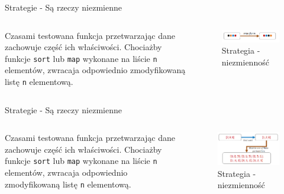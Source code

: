 \begin{frame}{Strategie - Są rzeczy niezmienne}
    \begin{columns}[t]
            Czasami testowana funkcja przetwarzając dane zachowuje część ich właściwości.
            Chociażby funkcje \texttt{sort} lub \texttt{map} wykonane na liście \texttt{n} elementów, zwracaja odpowiednio zmodyfikowaną listę \texttt{n} elementową.
        \centering
        \begin{figure}
            \centering
            \includegraphics[width=1\textwidth]{images/property_invariant.png}
            \caption{Strategia - niezmienność}
            \label{fig:invariant_strategy}
        \end{figure}    
    \end{columns}
\end{frame}

\begin{frame}{Strategie - Są rzeczy niezmienne}
    \begin{columns}[t]
            Czasami testowana funkcja przetwarzając dane zachowuje część ich właściwości.
            Chociażby funkcje \texttt{sort} lub \texttt{map} wykonane na liście \texttt{n} elementów, zwracaja odpowiednio zmodyfikowaną listę \texttt{n} elementową.
        \centering
        \begin{figure}
            \centering
            \includegraphics[width=1\textwidth]{images/property_list_sort_permutation.png}
            \caption{Strategia - niezmienność}
            \label{fig:invariant_strategy_example}
        \end{figure}    
    \end{columns}
\end{frame}


